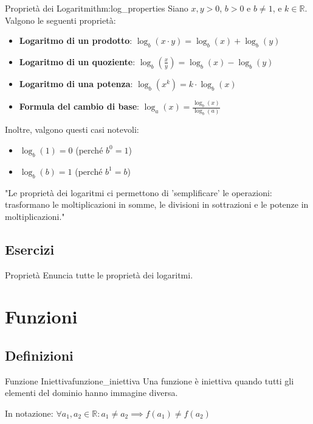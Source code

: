 \documentclass{article}
\begin{document}
\begin{theorem}{Proprietà dei Logaritmi}{thm:log_properties}
    Siano $x, y > 0$, $b > 0$ e $b \neq 1$, e $k \in \mathbb{R}$. Valgono le seguenti proprietà:
    \begin{itemize}
        \item \textbf{Logaritmo di un prodotto}: $\log_b(x \cdot y) = \log_b(x) + \log_b(y)$
        \item \textbf{Logaritmo di un quoziente}: $\log_b\left(\frac{x}{y}\right) = \log_b(x) - \log_b(y)$
        \item \textbf{Logaritmo di una potenza}: $\log_b(x^k) = k \cdot \log_b(x)$
        \item \textbf{Formula del cambio di base}: $\log_a(x) = \frac{\log_b(x)}{\log_b(a)}$
    \end{itemize}
    Inoltre, valgono questi casi notevoli:
    \begin{itemize}
        \item $\log_b(1) = 0$ (perché $b^0 = 1$)
        \item $\log_b(b) = 1$ (perché $b^1 = b$)
    \end{itemize}
    \vspace{1em}
    "Le proprietà dei logaritmi ci permettono di 'semplificare' le operazioni: trasformano le moltiplicazioni in somme, le divisioni in sottrazioni e le potenze in moltiplicazioni."
\end{theorem}


\subsection{Esercizi}

\begin{exercise}{Proprietà}{}
    Enuncia tutte le proprietà dei logaritmi.
\end{exercise}

\section{Funzioni}

\subsection{Definizioni}

\begin{definition}{Funzione Iniettiva}{funzione_iniettiva}
    Una funzione è iniettiva quando tutti gli elementi del dominio hanno immagine diversa.

    In notazione: $ \forall a_1, a_2 \in \mathbb{R}: a_1 \neq a_2 \implies f(a_1) \neq f(a_2)$
\end{definition}
\end{document}
